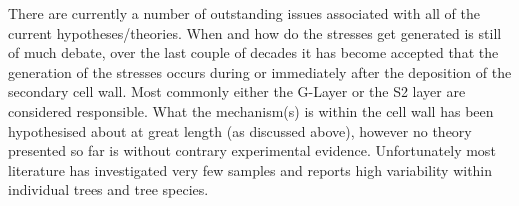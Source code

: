 There are currently a number of outstanding issues associated with all
of the current hypotheses/theories. When and how do the stresses get
generated is still of much debate, over the last couple of decades it has become accepted that the generation of the stresses occurs during or
immediately after the deposition of the secondary cell wall. Most commonly either
the G-Layer or the S2 layer are considered responsible. What the mechanism(s)
is within the cell wall has been hypothesised about at great length (as
discussed above), however no theory presented so far is without contrary
experimental evidence. Unfortunately most literature has investigated very few samples and reports high
variability within individual trees and tree species.